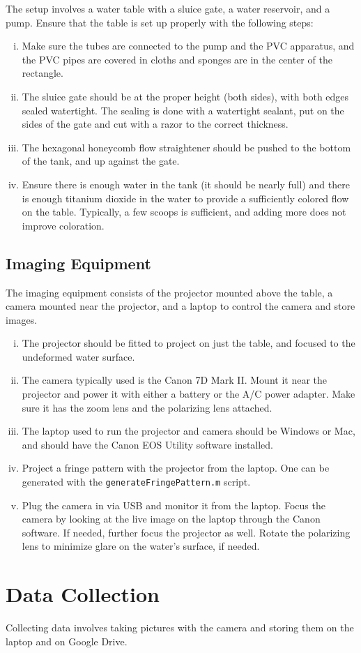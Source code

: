 \documentclass[11pt]{article}
\begin{document}
The setup involves a water table with a sluice gate, a water reservoir, and a pump. Ensure that the table is set up properly with the following steps:
\begin{enumerate}[(i)]
    \item Make sure the tubes are connected to the pump and the PVC apparatus, and the PVC pipes are covered in cloths and sponges are in the center of the rectangle.

    \item The sluice gate should be at the proper height (both sides), with both edges sealed watertight. The sealing is done with a watertight sealant, put on the sides of the gate and cut with a razor to the correct thickness.

    \item The hexagonal honeycomb flow straightener should be pushed to the bottom of the tank, and up against the gate.

    \item Ensure there is enough water in the tank (it should be nearly full) and there is enough titanium dioxide in the water to provide a sufficiently colored flow on the table. Typically, a few scoops is sufficient, and adding more does not improve coloration.
\end{enumerate}

\subsection*{Imaging Equipment}

The imaging equipment consists of the projector mounted above the table, a camera mounted near the projector, and a laptop to control the camera and store images.

\begin{enumerate}[(i)]
    \item The projector should be fitted to project on just the table, and focused to the undeformed water surface.

    \item The camera typically used is the Canon 7D Mark II. Mount it near the projector and power it with either a battery or the A/C power adapter. Make sure it has the zoom lens and the polarizing lens attached.

    \item The laptop used to run the projector and camera should be Windows or Mac, and should have the Canon EOS Utility software installed.

    \item Project a fringe pattern with the projector from the laptop. One can be generated with the {\tt generateFringePattern.m} script.

    \item Plug the camera in via USB and monitor it from the laptop. Focus the camera by looking at the live image on the laptop through the Canon software. If needed, further focus the projector as well. Rotate the polarizing lens to minimize glare on the water's surface, if needed.
\end{enumerate}

\section*{Data Collection}

Collecting data involves taking pictures with the camera and storing them on the laptop and on Google Drive.
\end{document}
